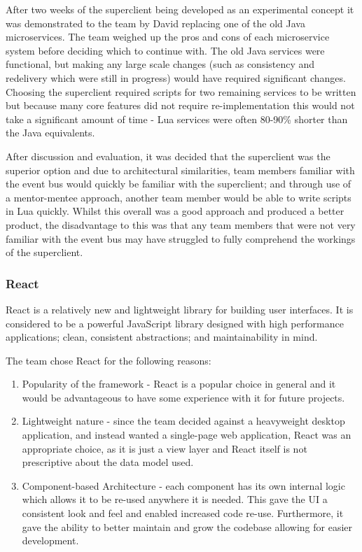 \documentclass{l3proj}
\begin{document}
After two weeks of the superclient being developed as an experimental concept it was demonstrated to the team by David replacing one of the old Java microservices. The team weighed up the pros and cons of each microservice system before deciding which to continue with. The old Java services were functional, but making any large scale changes (such as consistency and redelivery which were still in progress) would have required significant changes. Choosing the superclient required scripts for two remaining services to be written but because many core features did not require re-implementation this would not take a significant amount of time - Lua services were often 80-90\% shorter than the Java equivalents.

After discussion and evaluation, it was decided that the superclient was the superior option and due to architectural similarities, team members familiar with the event bus would quickly be familiar with the superclient; and through use of a mentor-mentee approach, another team member would be able to write scripts in Lua quickly. Whilst this overall was a good approach and produced a better product, the disadvantage to this was that any team members that were not very familiar with the event bus may have struggled to fully comprehend the workings of the superclient.

\subsubsection{React}
React is a relatively new and lightweight library for building user interfaces. It is considered to be a powerful JavaScript library designed with high performance applications; clean, consistent abstractions; and maintainability in mind.

The team chose React for the following reasons:

\begin{enumerate}
    \item Popularity of the framework - React is a popular choice in general and it would be advantageous to have some experience with it for future projects.
    \item Lightweight nature - since the team decided against a heavyweight desktop application, and instead wanted a single-page web application, React was an appropriate choice, as it is just a view layer and React itself is not prescriptive about the data model used.
    \item Component-based Architecture - each component has its own internal logic which allows it to be re-used anywhere it is needed. This gave the UI a consistent look and feel and enabled increased code re-use. Furthermore, it gave the ability to better maintain and grow the codebase allowing for easier development.
\end{enumerate}
\end{document}
